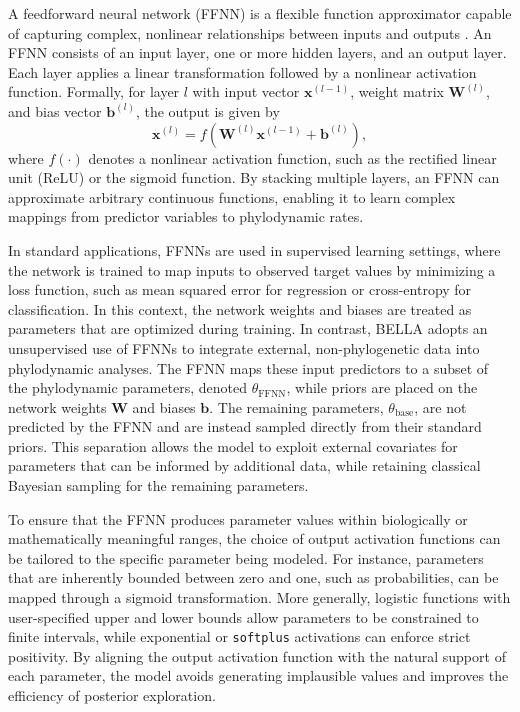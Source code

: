 A feedforward neural network (FFNN) is a flexible function approximator capable of capturing complex, nonlinear relationships between inputs and outputs \cite{haykin1994neural}.
An FFNN consists of an input layer, one or more hidden layers, and an output layer.
Each layer applies a linear transformation followed by a nonlinear activation function.
Formally, for layer $l$ with input vector $\mathbf{x}^{(l-1)}$, weight matrix $\mathbf{W}^{(l)}$, and bias vector $\mathbf{b}^{(l)}$, the output is given by
\[
    \mathbf{x}^{(l)} = f\!\left(\mathbf{W}^{(l)} \mathbf{x}^{(l-1)} + \mathbf{b}^{(l)}\right),
\]
where $f(\cdot)$ denotes a nonlinear activation function, such as the rectified linear unit (ReLU) or the sigmoid function.
By stacking multiple layers, an FFNN can approximate arbitrary continuous functions, enabling it to learn complex mappings from predictor variables to phylodynamic rates.

In standard applications, FFNNs are used in supervised learning settings, where the network is trained to map inputs to observed target values by minimizing a loss function, such as mean squared error for regression or cross-entropy for classification.
In this context, the network weights and biases are treated as parameters that are optimized during training.
In contrast, BELLA adopts an unsupervised use of FFNNs to integrate external, non-phylogenetic data into phylodynamic analyses.
The FFNN maps these input predictors to a subset of the phylodynamic parameters, denoted \( \theta_{\text{FFNN}} \), while priors are placed on the network weights \( \mathbf{W} \) and biases \( \mathbf{b} \).
The remaining parameters, \( \theta_{\text{base}} \), are not predicted by the FFNN and are instead sampled directly from their standard priors.
This separation allows the model to exploit external covariates for parameters that can be informed by additional data, while retaining classical Bayesian sampling for the remaining parameters.

To ensure that the FFNN produces parameter values within biologically or mathematically meaningful ranges, the choice of output activation functions can be tailored to the specific parameter being modeled.
For instance, parameters that are inherently bounded between zero and one, such as probabilities, can be mapped through a sigmoid transformation.
More generally, logistic functions with user-specified upper and lower bounds allow parameters to be constrained to finite intervals, while exponential or \texttt{softplus} activations can enforce strict positivity.
By aligning the output activation function with the natural support of each parameter, the model avoids generating implausible values and improves the efficiency of posterior exploration.

